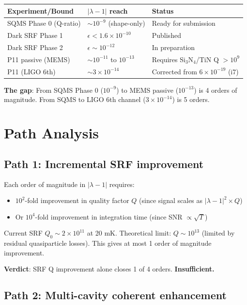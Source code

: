 \documentclass[11pt,a4paper]{article}
\begin{document}
\begin{center}
\begin{tabular}{lll}
\toprule
\textbf{Experiment/Bound} & \textbf{$|\lambda - 1|$ reach} & \textbf{Status} \\
\midrule
SQMS Phase 0 (Q-ratio) & $\sim 10^{-9}$ (shape-only) & Ready for submission \\
Dark SRF Phase 1 & $\epsilon < 1.6 \times 10^{-10}$ & Published \\
Dark SRF Phase 2 & $\epsilon \sim 10^{-12}$ & In preparation \\
P11 passive (MEMS) & $\sim 10^{-11}$ to $10^{-13}$ & Requires Si$_3$N$_4$/TiN Q $> 10^9$ \\
P11 (LIGO 6th) & $\sim 3 \times 10^{-14}$ & Corrected from $6 \times 10^{-19}$ (i7) \\
\bottomrule
\end{tabular}
\end{center}

\textbf{The gap}: From SQMS Phase 0 ($10^{-9}$) to MEMS passive ($10^{-13}$) is 4 orders of magnitude. From SQMS to LIGO 6th channel ($3 \times 10^{-14}$) is 5 orders.

\section{Path Analysis}

\subsection{Path 1: Incremental SRF improvement}

Each order of magnitude in $|\lambda-1|$ requires:
\begin{itemize}
\item $10^2$-fold improvement in quality factor $Q$ (since signal scales as $|\lambda-1|^2 \times Q$)
\item Or $10^4$-fold improvement in integration time (since SNR $\propto \sqrt{T}$)
\end{itemize}

Current SRF $Q_0 \sim 2 \times 10^{11}$ at 20 mK. Theoretical limit: $Q \sim 10^{13}$ (limited by residual quasiparticle losses). This gives at most 1 order of magnitude improvement.

\textbf{Verdict}: SRF Q improvement alone closes 1 of 4 orders. \textbf{Insufficient.}

\subsection{Path 2: Multi-cavity coherent enhancement}
\end{document}
